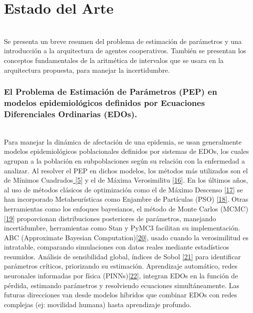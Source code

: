 \chapter{Estado del Arte}\label{chapter:state-of-the-art}
\label{sec:13} \\

Se presenta un breve resumen del problema de estimación de parámetros y una introducción a la arquitectura de agentes cooperativos. También se presentan los conceptos fundamentales de la aritmética de intervalos que se usara en la arquitectura propuesta, para manejar la incertidumbre.

    \subsection*{ El Problema de Estimación de Parámetros (PEP) en modelos epidemiológicos definidos por Ecuaciones Diferenciales Ordinarias (EDOs).} \\


    Para manejar la dinámica de afectación de una epidemia, se usan generalmente modelos epidemiológicos poblacionales definidos por sistemas de EDOs,
    los cuales agrupan a la población en subpoblaciones según su relación con la enfermedad a analizar. Al resolver el PEP en dichos modelos, los métodos
    más utilizados son el de Mínimos Cuadrados\hyperref[sec:5]{ [5]} y el de Máxima Verosimilitu \hyperref[sec:27]{[16]}. En los últimos años, al uso de métodos clásicos
    de optimización como el de Máximo Descenso \hyperref[sec:27]{[17]} se han incorporado Metaheurísticas como Enjambre de Partículas (PSO) \hyperref[sec:28]{[18]}. Otras herramientas como los enfoques bayesianos, el método de Monte
    Carlos (MCMC) \hyperref[sec:29]{[19]} proporcionan distribuciones posteriores de parámetros, manejando incertidumbre, herramientas como Stan y PyMC3 facilitan su implementación.
    ABC (Approximate Bayesian Computation)\hyperref[sec:30]{[20]}, usado cuando la verosimilitud es intratable, comparando simulaciones con datos reales mediante estadísticos resumidos.
    Análisis de sensibilidad global, índices de Sobol \hyperref[sec:31]{[21]} para identificar parámetros críticos, priorizando su estimación. Aprendizaje automático, redes neuronales
    informadas por física (PINNs)\hyperref[sec:32]{[22]}, integran EDOs en la función de pérdida, estimando parámetros y resolviendo ecuaciones simultáneamente. Las futuras direcciones van desde modelos híbridos que combinar EDOs con redes
    complejas (ej: movilidad humana) hasta aprendizaje profundo.

